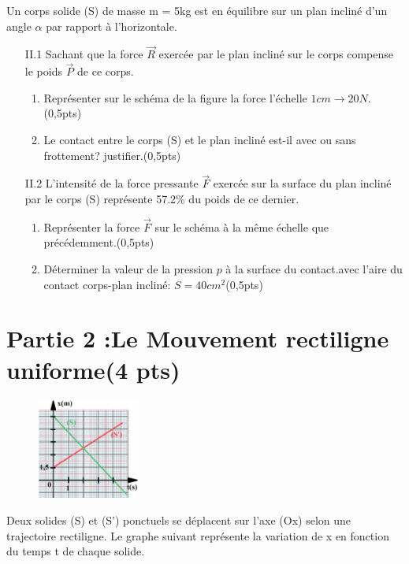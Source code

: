 \documentclass[12pt]{article}
\begin{document}
Un corps solide (S) de masse m = 5kg est en équilibre sur un
plan incliné d’un angle $\alpha$ par rapport à l’horizontale.
\begin{enumerate}
	\item[II.1] Sachant que la force $\vec{R}$ exercée par le plan incliné sur le
		corps compense le poids $\vec{P}$ de ce corps.
		\begin{enumerate}
			\item Représenter sur le schéma de la figure la force l’échelle $1cm \rightarrow 20N$.\dotfill(0,5pts)
			\item Le contact entre le corps (S) et le plan incliné est-il avec ou sans frottement? justifier.\dotfill(0,5pts)

		\end{enumerate}
	\item[II.2] L’intensité de la force pressante $\vec{F}$ exercée sur la surface du plan incliné par le corps (S) représente
57.2\% du poids de ce dernier.
\begin{enumerate}
	\item Représenter la force $\vec{F}$ sur le schéma à la même échelle que précédemment.\dotfill(0,5pts)
	\item Déterminer la valeur de la pression $p$ à la surface du contact.avec l'aire du contact corps-plan incliné: $S = 40cm^2$\dotfill(0,5pts)
\end{enumerate}
\end{enumerate}


 \section*{Partie 2 :Le Mouvement rectiligne uniforme\dotfill(4 pts)}
\begin{figure}
	\begin{center}
		\includegraphics[width=0.3\textwidth]{./img/ex_Mvt.png}
	\end{center}
\end{figure}


	  Deux solides (S) et (S') ponctuels se déplacent sur l'axe (Ox) selon une
trajectoire rectiligne. Le graphe suivant représente la variation de x en
fonction du temps t de chaque solide.
\end{document}
